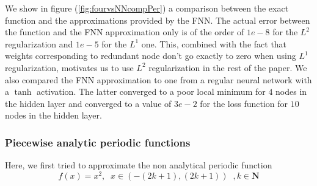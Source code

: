 \documentclass[AMS,STIX1COL]{WileyNJD-v2}
\begin{document}
We show in figure (\ref{fig:fourvsNNcompPer}) a comparison between the exact function and the approximations provided by the FNN. The actual error between the function and the FNN approximation only is of the order of $1e-8$ for the $L^2$ regularization and $1e-5$ for the $L^1$ one. This, combined with the fact that weights corresponding to redundant node don't go exactly to zero when using $L^1$ regularization, motivates us to use $L^2$ regularization in the rest of the paper. We also compared the FNN approximation to one from a regular neural network with a $\tanh$ activation. The latter converged to a poor local minimum for $4$ nodes in the hidden layer and converged to a value of $3e-2$ for the loss function for $10$ nodes in the hidden layer. 





\subsubsection{Piecewise analytic periodic functions}  
Here, we first tried to approximate the non analytical periodic function
\begin{equation}\label{Eq:xsquare}
  f(x) = x^2, \;\; \text{$x \in \left(-(2k+1), (2k+1)\right)$}\;\;, k \in \mathbf{N}  
\end{equation}
\end{document}

